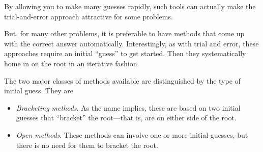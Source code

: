 \documentclass[../main.tex]{subfiles}
\begin{document}
\noindent By allowing you to make many guesses rapidly, such tools can
actually make the trial-and-error approach attractive for some problems.

But, for many other problems, it is preferable to have methods that come up with the
correct answer automatically. Interestingly, as with trial and error, these approaches require
an initial ``guess'' to get started. Then they systematically home in on the root in an iterative
fashion.

The two major classes of methods available are distinguished by the type of initial
guess. They are

\begin{itemize}
    \item \emph{Bracketing methods}. As the name implies, these are based on two initial guesses that
    ``bracket'' the root---that is, are on either side of the root.
    \item \emph{Open methods}. These methods can involve one or more initial guesses, but there is no
    need for them to bracket the root.
\end{itemize}
\newpage
\end{document}

